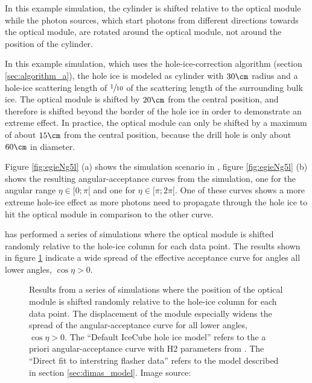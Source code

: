 In this example simulation, the cylinder is shifted relative to the optical module while the photon sources, which start photons from different directions towards the optical module, are rotated around the optical module, not around the position of the cylinder.


In this example simulation, which uses the hole-ice-correction algorithm (section \ref{sec:algorithm_a}), the hole ice is modeled as cylinder with $30\cm$ radius and a hole-ice scattering length of $\sfrac{1}{10}$ of the scattering length of the surrounding bulk ice. The optical module is shifted by $20\cm$ from the central position, and therefore is shifted beyond the border of the hole ice in order to demonstrate an extreme effect. In practice, the optical module can only be shifted by a maximum of about $15\cm$ from the central position, because the drill hole is only about $60\cm$ in diameter.

Figure \ref{fig:egieNg5l} (a) shows the simulation scenario in \steamshovel, figure \ref{fig:egieNg5l} (b) shows the resulting angular-acceptance curves from the simulation, one for the angular range $\eta \in [0;\pi[$ and one for $\eta \in [\pi; 2\pi[$. One of these curves shows a more extreme hole-ice effect as more photons need to propagate through the hole ice to hit the optical module in comparison to the other curve.

\rongen \cite{icrc17pocam} has performed a series of simulations where the optical module is shifted randomly relative to the hole-ice column for each data point. The results shown in figure \ref{fig:zao5Mah0} indicate a wide spread of the effective acceptance curve for angles all lower angles, $\cos \eta > 0$.

\begin{figure}[htbp]
  \caption{Results from a series of simulations where the position of the optical module is shifted randomly relative to the hole-ice column for each data point. The displacement of the module especially widens the spread of the angular-acceptance curve for all lower angles, $\cos \eta > 0$. The \enquote{Default IceCube hole ice model} refers to the a priori angular-acceptance curve with H2 parameters from \cite{icepaper}. The \enquote{Direct fit to interstring flasher data} refers to the model described in section \ref{sec:dimas_model}. Image source: \cite{icrc17pocam}}
  \label{fig:zao5Mah0}
\end{figure}
